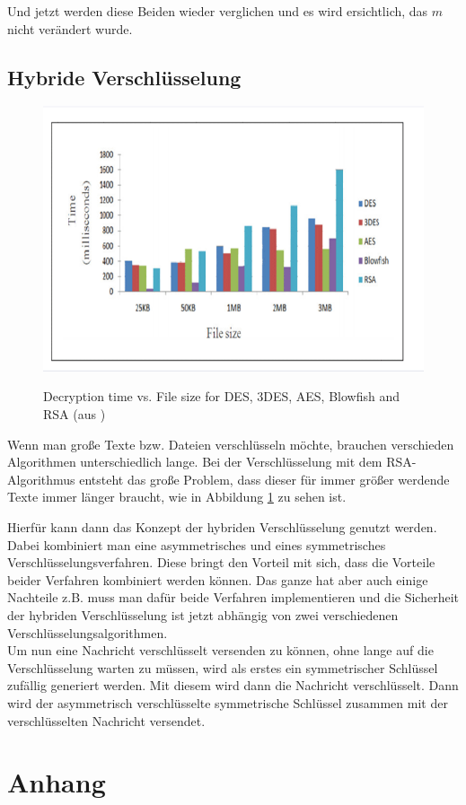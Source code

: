 \documentclass[12pt,a4paper]{scrartcl}
\begin{document}
Und jetzt werden diese Beiden wieder verglichen und es wird ersichtlich, das $m$ nicht verändert wurde.


	 	
	\subsection{Hybride Verschlüsselung}
		\label{cha:hybrid}
		\begin{figure}
		
\includegraphics[scale=0.45]{rsa_time} \\
\caption{Decryption time vs. File size for DES, 3DES, AES, Blowfish and RSA (aus \cite{rsatime})}
\label{fig:figure5}
\end{figure}
		
		Wenn man große Texte bzw. Dateien verschlüsseln möchte, brauchen verschieden Algorithmen unterschiedlich lange. Bei der Verschlüsselung mit dem RSA-Algorithmus entsteht das große Problem, dass dieser für immer größer  werdende Texte immer länger braucht, wie in Abbildung \ref{fig:figure5} zu sehen ist. 

		Hierfür kann dann das Konzept der hybriden Verschlüsselung genutzt werden. Dabei kombiniert man eine asymmetrisches und eines symmetrisches Verschlüsselungsverfahren. Diese bringt den Vorteil mit sich, dass die Vorteile  beider Verfahren kombiniert werden können. Das ganze hat aber auch einige Nachteile z.B. muss man dafür beide Verfahren implementieren und die Sicherheit der hybriden Verschlüsselung ist jetzt abhängig von zwei verschiedenen Verschlüsselungsalgorithmen. \\
		Um nun eine Nachricht verschlüsselt versenden zu können, ohne lange auf die Verschlüsselung warten zu müssen, wird als erstes ein symmetrischer Schlüssel zufällig generiert werden. Mit diesem wird dann die Nachricht verschlüsselt. Dann wird der asymmetrisch verschlüsselte symmetrische Schlüssel zusammen mit der verschlüsselten Nachricht versendet.


\pagebreak
\section{Anhang}

\listoffigures
\pagebreak

\nocite{*}
\printbibliography
\end{document}

